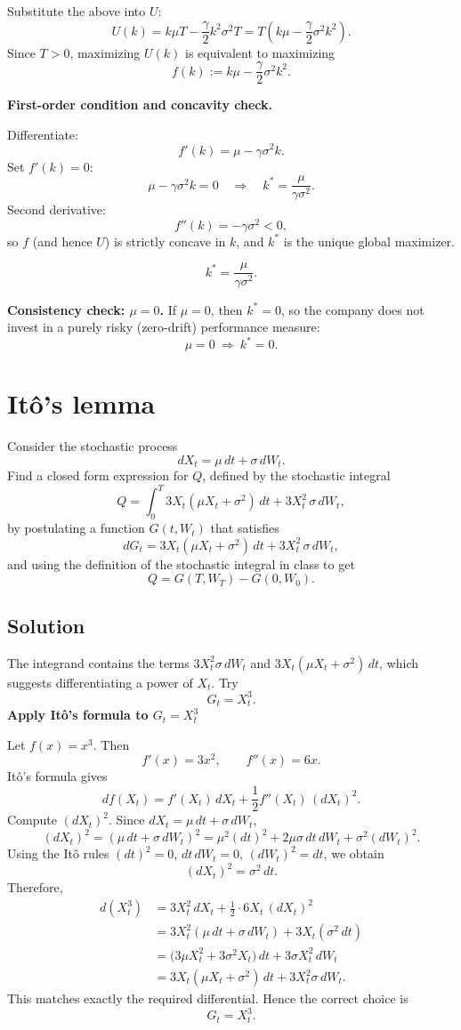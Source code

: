 \documentclass{article}
\begin{document}
\begin{enumerate}
Substitute the above into $U$:
\[
U(k)=k\mu T-\frac{\gamma}{2}k^2\sigma^2T
=T\left(k\mu-\frac{\gamma}{2}\sigma^2k^2\right).
\]
Since $T>0$, maximizing $U(k)$ is equivalent to maximizing
\[
f(k):=k\mu-\frac{\gamma}{2}\sigma^2k^2.
\]

\medskip
\noindent\textbf{First-order condition and concavity check.}

Differentiate:
\[
f'(k)=\mu-\gamma\sigma^2k.
\]
Set $f'(k)=0$:
\[
\mu-\gamma\sigma^2k=0
\quad\Longrightarrow\quad
k^\ast=\frac{\mu}{\gamma\sigma^2}.
\]
Second derivative:
\[
f''(k)=-\gamma\sigma^2<0,
\]
so $f$ (and hence $U$) is strictly concave in $k$, and $k^\ast$ is the unique global maximizer.

\[
\boxed{\,k^\ast=\dfrac{\mu}{\gamma\sigma^2}.\,}
\]

\medskip
\noindent \textbf{Consistency check: $\mu=0$.}
If $\mu=0$, then $k^\ast=0$, so the company does not invest in a purely risky (zero-drift) performance measure:
\[
\boxed{\,\mu=0 \ \Longrightarrow\ k^\ast=0.\,}
\]
\end{enumerate}

\newpage
\section{It\^o's lemma}

Consider the stochastic process
\[
dX_t=\mu\,dt+\sigma\,dW_t.
\]
Find a closed form expression for $Q$, defined by the stochastic integral
\[
Q=\int_0^T 3X_t(\mu X_t+\sigma^2)\,dt + 3X_t^2\,\sigma\, dW_t,
\]
by postulating a function $G(t,W_t)$ that satisfies
\[
dG_t = 3X_t(\mu X_t+\sigma^2)\,dt + 3X_t^2\,\sigma\, dW_t,
\]
and using the definition of the stochastic integral in class to get
\[
Q=G(T,W_T)-G(0,W_0).
\]

\subsection*{Solution}

The integrand contains the terms \(3X_t^2\sigma\, dW_t\) and \(3X_t(\mu X_t+\sigma^2)\,dt\), which  suggests differentiating a power of \(X_t\).
Try
\[
G_t = X_t^3.
\]
\noindent \textbf{Apply It\^{o}'s formula to \(G_t=X_t^3\)}

Let \(f(x)=x^3\). Then
\[
f'(x)=3x^2,\qquad f''(x)=6x.
\]
It\^{o}'s formula gives
\[
df(X_t)=f'(X_t)\,dX_t+\frac12 f''(X_t)\,(dX_t)^2.
\]
Compute \((dX_t)^2\). Since \(dX_t=\mu\,dt+\sigma\,dW_t\),
\[
(dX_t)^2 = (\mu\,dt+\sigma\,dW_t)^2
= \mu^2(dt)^2 + 2\mu\sigma\,dt\,dW_t + \sigma^2(dW_t)^2.
\]
Using the It\^{o} rules \((dt)^2=0\), \(dt\,dW_t=0\), \((dW_t)^2=dt\), we obtain
\[
(dX_t)^2=\sigma^2\,dt.
\]
Therefore,
\begin{align*}
d(X_t^3)
&= 3X_t^2\,dX_t + \frac12\cdot 6X_t\,(dX_t)^2\\
&= 3X_t^2(\mu\,dt+\sigma\,dW_t) + 3X_t(\sigma^2\,dt)\\
&= \big(3\mu X_t^2 + 3\sigma^2 X_t\big)\,dt + 3\sigma X_t^2\,dW_t\\
&= 3X_t(\mu X_t+\sigma^2)\,dt + 3X_t^2\sigma\,dW_t.
\end{align*}
This matches exactly the required differential. Hence the correct choice is
\[
G_t = X_t^3.
\]
\end{document}
